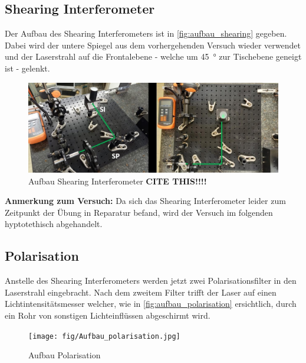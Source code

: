 \documentclass[ngerman]{scrartcl}
\begin{document}
\subsection{Shearing Interferometer}
\label{sec:aufbau_shearing}
Der Aufbau des Shearing Interferometers ist in \autoref{fig:aufbau_shearing} gegeben. Dabei wird der untere Spiegel aus dem vorhergehenden Versuch wieder verwendet und der Laserstrahl auf die Frontalebene - welche um \SI{45}{\degree} zur Tischebene geneigt ist - gelenkt. 
\begin{figure}[H]
    \centering
    \begin{samepage}
        \includegraphics[width=0.9\linewidth]{fig/shearing.jpg}
        \caption{Aufbau Shearing Interferometer \textbf{CITE THIS!!!!}}
        \label{fig:aufbau_shearing}
    \end{samepage}
\end{figure}
\textbf{Anmerkung zum Versuch:} Da sich das Shearing Interferometer leider zum Zeitpunkt der Übung in Reparatur befand, wird der Versuch im folgenden hyptotethisch abgehandelt.  
\subsection{Polarisation}
\label{sec:aufbau_polarisation}
Anstelle des Shearing Interferometers werden jetzt zwei Polarisationsfilter in den Laserstrahl eingebracht. Nach dem zweitem Filter trifft der Laser auf einen Lichtintensitätsmesser welcher, wie in \autoref{fig:aufbau_polarisation} ersichtlich, durch ein Rohr von sonstigen Lichteinflüssen abgeschirmt wird.
\begin{figure}[H]
    \centering
    \begin{samepage}
        \texttt{[image: fig/Aufbau\_polarisation.jpg]}
        \caption{Aufbau Polarisation}
        \label{fig:aufbau_polarisation}
    \end{samepage}
\end{figure}
\end{document}
